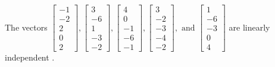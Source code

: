 \begin{exercise}
\begin{exerciseStatement}
  \end{exerciseStatement}
  \begin{exerciseAnswer}
   The vectors \(\left[\begin{array}{r}
-1 \\
-2 \\
2 \\
0 \\
2
\end{array}\right] , \left[\begin{array}{r}
3 \\
-6 \\
1 \\
-3 \\
-2
\end{array}\right] , \left[\begin{array}{r}
4 \\
0 \\
-1 \\
-6 \\
-1
\end{array}\right] , \left[\begin{array}{r}
3 \\
-2 \\
-3 \\
-4 \\
-2
\end{array}\right] , \text{ and } \left[\begin{array}{r}
1 \\
-6 \\
-3 \\
0 \\
4
\end{array}\right]\) are 
  	 linearly independent  .
  


  \end{exerciseAnswer}
\end{exercise}